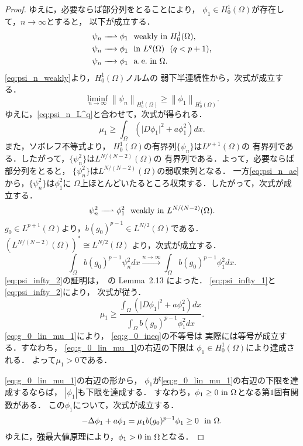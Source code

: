 \begin{proof}
 ゆえに，必要ならば部分列をとることにより，
 $\phi_1 \in H_0^1(\Omega)$が存在して，$n \to \infty$とすると，
 以下が成立する．
 \begin{align}
  \psi_n \xrightharpoonup{ \mbox{ ~ } } \phi_1 & \ \ \text{weakly~} \tin
  H_0^1(\Omega), \label{eq:psi_n_weakly} \\
  \psi_n \xrightarrow{ \mbox{ ~ } } \phi_1 & \ \ \tin L^q(\Omega) \ \
   (q < p+1), \label{eq:psi_n_L^q} \\
  \psi_n \xrightarrow{ \mbox{ ~ } } \phi_1 & \ \ \ae \tin \Omega. 
    \label{eq:psi_n_ae} 
 \end{align}
 \eqref{eq:psi_n_weakly}より，$H_0^1(\Omega)$ノルムの
 弱下半連続性から，次式が成立する．
 \[
  \liminf_{n \to \infty} \left\| \psi_n \right\|_{H_0^1(\Omega)}
 \geq \left\| \phi_1 \right\|_{H_0^1(\Omega)}.
 \]
 ゆえに，\eqref{eq:psi_n_L^q}と合わせて，次式が得られる．
 \begin{equation}
  \mu_1 \geq \int_\Omega \left( \lvert D\phi_1 \rvert^2 + a 
                          \phi_1 ^2
                         \right) dx. \label{eq:psi_infty_1}
 \end{equation}
 また，ソボレフ不等式より，
 $H_0^1(\Omega)$の有界列$\{ \psi_n \}$は$L^{p+1}(\Omega)$の
 有界列である．したがって，$\{ \psi_n^2 \}$は$L^{N/(N-2)}(\Omega)$の
 有界列である．よって，必要ならば部分列をとると，
 $\{\psi_n^2 \}$は$L^{N/(N-2)}(\Omega)$の弱収束列となる．
 一方\eqref{eq:psi_n_ae}から，$\{ \psi_n^2 \}$は$\phi_1^2$に
 $\Omega$上ほとんどいたるところ収束する．したがって，次式が成立する．
 \[
 \psi_n^2 \xrightharpoonup{ \mbox{ ~ } } \phi_1^2 \ \ \text{weakly~} \tin
 L^{N/(N-2)}(\Omega).
 \]
 $g_0 \in L^{p+1}(\Omega)$より，$b (g_0)^{p-1} \in
 L^{N/2} (\Omega)$である．$\left(L^{N/(N-2)}(\Omega)\right)^*
 \cong L^{N/2}(\Omega)$
 より，次式が成立する．
 \begin{equation}
  \int_\Omega b(g_0)^{p-1} \psi_n^2 dx \xrightarrow{n \to \infty}
   \int_{\Omega} b(g_0)^{p-1} \phi_1^2 dx. \label{eq:psi_infty_2}
 \end{equation}
 \eqref{eq:psi_infty_2}の証明は，\cite{MR1400007}~の Lemma~2.13 によった．
 \eqref{eq:psi_infty_1}と\eqref{eq:psi_infty_2}により，
 次式が従う．
 \begin{equation}
  \mu_1 \geq \frac{\displaystyle \int_\Omega 
   \left( \lvert D\phi_1 \rvert^2 + a \phi_1 ^2
   \right) dx}{\displaystyle \int_{\Omega} b(g_0)^{p-1} 
   \phi_1^2 dx}. \label{eq:g_0_ineq}
 \end{equation}
 \eqref{eq:g_0_lin_mu_1}により，
 \eqref{eq:g_0_ineq}の不等号は
 実際には等号が成立する．すなわち，
 \eqref{eq:g_0_lin_mu_1}の右辺の下限は
 $\phi_1 \in H_0^1(\Omega)$により達成される．
 よって$\mu_1 > 0$である．
 
 \eqref{eq:g_0_lin_mu_1}の右辺の形から，
 $\phi_1$が\eqref{eq:g_0_lin_mu_1}の右辺の下限を達成するならば，
 $\left| \phi_1 \right|$も下限を達成する．
 すなわち，$\phi_1 \geq 0 ~\text{in}~ \Omega$となる第$1$固有関数がある．
 この$\phi_1$について，次式が成立する．
 \[
  - \Delta \phi_1 + a \phi_1 = \mu_1 b (g_0)^{p-1} 
 \phi_1 \geq 0 \ \ \text{in}~ \Omega.
 \]
 ゆえに，強最大値原理により，$\phi_1 > 0 ~\text{in}~ \Omega$となる．
 \qedhere
\end{proof}

